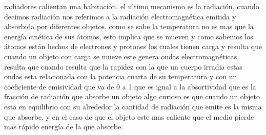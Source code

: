 \documentclass{article}
\begin{document}
radiadores calientan una habitación.
el ultimo mecanismo es la radiación,
cuando decimos radiación nos referimos a la radiación electromagnética emitida y absorbida por diferentes objetos,
como se sabe la temperatura no es mas que la energía cinética de sus átomos, esto implica que se mueven y como sabemos los
átomos están hechos de electrones y protones los cuales tienen carga y resulta que cuando un objeto con carga se mueve este
genera ondas electromagnéticas, resulta que cuando resulta que la rapidez con la que un cuerpo irradia estas ondas esta 
relacionada con la potencia cuarta de su temperatura y con un coeficiente de emisividad que va de 0 a 1 que es igual a la 
absortividad que es la fracción de radiación que absorbe un objeto algo curioso es que cuando un objeto esta en equilibrio
con su alrededor la cantidad de radiación que emite es la misma que absorbe, y en el caso de que el objeto este mas caliente 
que el medio pierde mas rápido energía de la que absorbe.
\end{document}
